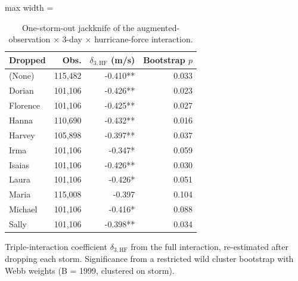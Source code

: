 \begin{table}

\caption{One-storm-out jackknife of the augmented-observation $\times$ 3-day $\times$ hurricane-force interaction. \label{tab:precision_jackknife_maria}}
\centering
\begin{adjustbox}{max width = \textwidth}
\begin{threeparttable}
\begin{tabular}[t]{lrrr}
\toprule
Dropped & Obs. & $\delta_{3,\text{HF}}$ (m/s) & Bootstrap $p$\\
\midrule
(None) & 115,482 & -0.410** & 0.033\\
Dorian & 101,106 & -0.426** & 0.023\\
Florence & 101,106 & -0.425** & 0.027\\
Hanna & 110,690 & -0.432** & 0.016\\
Harvey & 105,898 & -0.397** & 0.037\\
Irma & 101,106 & -0.347* & 0.059\\
Isaias & 101,106 & -0.426** & 0.030\\
Laura & 101,106 & -0.426* & 0.051\\
Maria & 115,008 & -0.397 & 0.104\\
Michael & 101,106 & -0.416* & 0.088\\
Sally & 101,106 & -0.398** & 0.034\\
\bottomrule
\end{tabular}
\begin{tablenotes}
\small
\item Triple-interaction coefficient $\delta_{3,\text{HF}}$ from the full interaction, re-estimated after dropping each storm. Significance from a restricted wild cluster bootstrap with Webb weights (B = 1999, clustered on storm).
\end{tablenotes}
\end{threeparttable}
\end{adjustbox}
\end{table}
